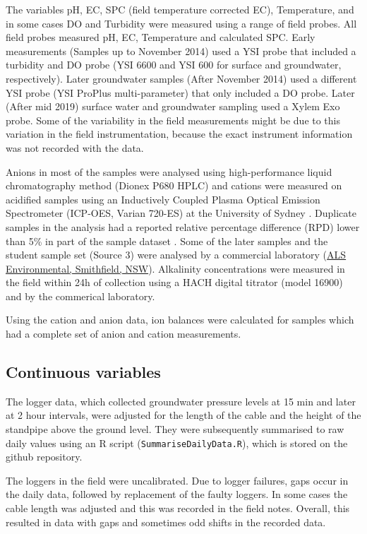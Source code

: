 \documentclass[, manuscript]{copernicus}
\begin{document}
The variables pH, EC, SPC (field temperature corrected EC), Temperature,
and in some cases DO and Turbidity were measured using a range of field
probes. All field probes measured pH, EC, Temperature and calculated
SPC. Early measurements (Samples up to November 2014) used a YSI probe
that included a turbidity and DO probe (YSI 6600 and YSI 600 for surface
and groundwater, respectively). Later groundwater samples (After
November 2014) used a different YSI probe (YSI ProPlus multi-parameter)
that only included a DO probe. Later (After mid 2019) surface water and
groundwater sampling used a Xylem Exo probe. Some of the variability in
the field measurements might be due to this variation in the field
instrumentation, because the exact instrument information was not
recorded with the data.

Anions in most of the samples were analysed using high-performance
liquid chromatography method (Dionex P680 HPLC) and cations were
measured on acidified samples using an Inductively Coupled Plasma
Optical Emission Spectrometer (ICP-OES, Varian 720-ES) at the University
of Sydney \citep{Akter2018}. Duplicate samples in the analysis had a
reported relative percentage difference (RPD) lower than 5\% in part of
the sample dataset \citep{Akter2018}. Some of the later samples and the
student sample set (Source 3) were analysed by a commercial laboratory
(\href{https://www.alsglobal.com/en/locations/asia-pacific/pacific/australia/nsw/sydney-woodpark-environmental}{ALS
Environmental, Smithfield, NSW}). Alkalinity concentrations were
measured in the field within 24h of collection using a HACH digital
titrator (model 16900) \citep{Akter2018} and by the commerical
laboratory.

Using the cation and anion data, ion balances were calculated for
samples which had a complete set of anion and cation measurements.

\subsection{Continuous variables}

The logger data, which collected groundwater pressure levels at 15 min
and later at 2 hour intervals, were adjusted for the length of the cable
and the height of the standpipe above the ground level. They were
subsequently summarised to raw daily values using an R script
(\texttt{SummariseDailyData.R}), which is stored on the github
repository.

The loggers in the field were uncalibrated. Due to logger failures, gaps
occur in the daily data, followed by replacement of the faulty loggers.
In some cases the cable length was adjusted and this was recorded in the
field notes. Overall, this resulted in data with gaps and sometimes odd
shifts in the recorded data.
\end{document}

